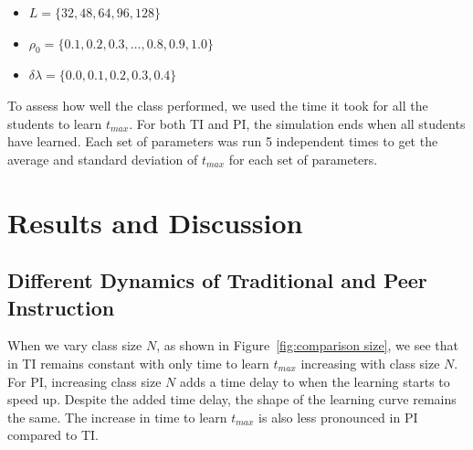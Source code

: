 \documentclass[twocolumn,secnumarabic,amssymb, nobibnotes, aps, prd]{revtex4-2}
\begin{document}
        \begin{itemize}
            \item $L=\lbrace32,48,64,96,128\rbrace$
            \item $\rho_0=\lbrace0.1, 0.2, 0.3,\dots, 0.8, 0.9, 1.0\rbrace$
            \item $\delta\lambda=\lbrace0.0, 0.1, 0.2, 0.3, 0.4\rbrace$
        \end{itemize}

        To assess how well the class performed, we used the time it took for all the students to learn $t_{max}$.
        For both TI and PI, the simulation ends when all students have learned.
        Each set of parameters was run 5 independent times to get the average and standard deviation of $t_{max}$ for each set of parameters.




\section{Results and Discussion}

    \subsection{Different Dynamics of Traditional and Peer Instruction}
        
        When we vary class size $N$, as shown in Figure~\ref{fig:comparison size}, we see that in TI remains constant with only time to learn $t_{max}$ increasing with class size $N$.
        For PI, increasing class size $N$ adds a time delay to when the learning starts to speed up. Despite the added time delay, the shape of the learning curve remains the same.
        The increase in time to learn $t_{max}$ is also less pronounced in PI compared to TI.
\end{document}
